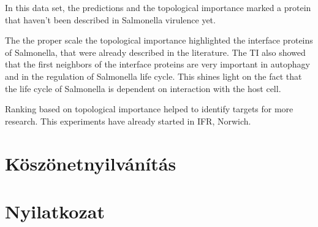 \documentclass[a4paper,12pt]{article}
\begin{document}
		In this data set, the predictions and the topological importance marked a protein that haven't been described in Salmonella virulence yet.
		
		The the proper scale the topological importance highlighted the interface proteins of Salmonella, that were already described in the literature. The TI also showed that the first neighbors of the interface proteins are very important in autophagy and in the regulation of Salmonella life cycle. This shines light on the fact that the life cycle of Salmonella is dependent on interaction with the host cell. 
		
		Ranking based on topological importance helped to identify targets for more research. This experiments have already started in IFR, Norwich.
				
		\pagebreak

\section{Köszönetnyilvánítás}

\section{Nyilatkozat}

\pagebreak


{}

\end{document}

